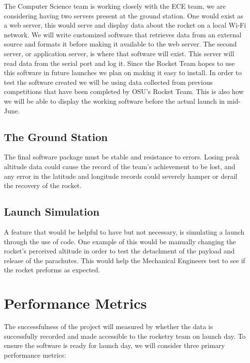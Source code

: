 \documentclass[10pt,journal,draftclsnofoot,onecolumn]{IEEEtran}
\begin{document}
	The Computer Science team is 
	working closely with the ECE team, we are considering having two servers 
	present at the ground station. One would exist as a web server, this would
	serve and display data about the rocket on a local Wi-Fi network. We will
	write customized software that retrieves data from an external source and
	formats it before making it available to the web server. The second server,
	or application server, is where that software will exist. This server will
	read data from the serial port and log it. Since the Rocket Team hopes to 
	use this software in future launches we plan on making it easy to install.
	In order to test the software created we will be using data collected from
	previous competitions that have been completed by OSU's Rocket Team. This is
	also how we will be able to display the working software before the actual
	launch in mid-June.
	
	\subsection{The Ground Station}
	
	The final software package must be stable and resistance to errors.
	Losing peak altitude data could cause the record of the team's
	achievement to be lost, and any error in the latitude
	and longitude records could severely hamper or derail
	the recovery of the rocket.
	
	\subsection{Launch Simulation}
	
	A feature that would be helpful to have but not necessary, is simulating a launch
	through the use of code. One example of this would be manually changing the rocket's 
	perceived altitude in order to test the detachment of the payload and release of the
	parachutes. This would help the Mechanical Engineers test to see if 
	the rocket preforms as expected. 
	
	\section{Performance Metrics}
	
	The successfulness of the project will measured by whether the data
	is successfully recorded and made accessible to the rocketry team
	on launch day. To ensure the software is ready for launch day,
	we will consider three primary performance metrics:
	
\end{document}
